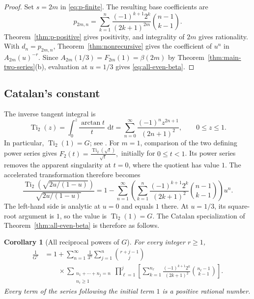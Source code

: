 \documentclass[11pt,reqno]{amsart}
\numberwithin{equation}{section}
\newtheorem{corollary}[theorem]{Corollary}
\theoremstyle{definition}
\theoremstyle{remark}
\DeclareMathOperator{\Ti}{Ti}
\newcommand{\dd}{\,\mathrm{d}}
\newcommand{\Gconst}{G}
\begin{document}
\begin{proof}
Set \(s=2m\) in \eqref{eq:p-finite}.  The resulting base coefficients
are
\[
 p_{2m,n}
 =
 \sum_{k=1}^{n}
 \frac{(-1)^{k+1}2^k}{(2k+1)^{2m}}
 \binom{n-1}{k-1}.
\]
Theorem~\ref{thm:p-positive} gives positivity, and integrality of
\(2m\) gives rationality.  With \(d_n=p_{2m,n}\),
Theorem~\ref{thm:nonrecursive} gives the coefficient of \(u^n\) in
\(A_{2m}(u)^{-r}\).  Since
\(
 A_{2m}(1/3)=F_{2m}(1)=\beta(2m)
\)
by Theorem~\ref{thm:main-two-series}(b), evaluation at \(u=1/3\)
gives \eqref{eq:all-even-beta}.
\end{proof}

\subsection{Catalan's constant}
\label{sec:catalan}

The inverse tangent integral is
\[
 \Ti_2(z)
 =
 \int_0^z\frac{\arctan t}{t}\,\dd t
 =
 \sum_{n=0}^{\infty}
 \frac{(-1)^nz^{2n+1}}{(2n+1)^2},
 \qquad 0\leq z\leq1.
\]
In particular, \(\Ti_2(1)=\Gconst\); see
\cite[Eqs, (1) and (3)]{Ramanujan1915}.  For \(m=1\), comparison of the two
defining power series gives
\(
 F_2(t)=\frac{\Ti_2(\sqrt t)}{\sqrt t},
\)
initially for \(0\leq t<1\).  Its power series removes the apparent
singularity at \(t=0\), where the quotient has value \(1\).  The
accelerated transformation therefore becomes
\begin{equation}\label{eq:transformed-Ti2}
 \frac{\Ti_2\!\left(\sqrt{2u/(1-u)}\right)}
 {\sqrt{2u/(1-u)}}
 =
 1-\sum_{n=1}^{\infty}
 \left(
 \sum_{k=1}^{n}
 \frac{(-1)^{k+1}2^k}{(2k+1)^2}
 \binom{n-1}{k-1}
 \right)u^n.
\end{equation}
The left-hand side is analytic at \(u=0\) and equals \(1\) there.  At
\(u=1/3\), its square-root argument is \(1\), so the value is
\(\Ti_2(1)=\Gconst\).  The Catalan specialization of
Theorem~\ref{thm:all-even-beta} is therefore as follows.

\begin{corollary}[All reciprocal powers of \(\Gconst\)]
\label{cor:all-G}
For every integer \(r\geq1\),
\begin{equation}\label{eq:all-G}
\begin{aligned}
 \frac1{\Gconst^r}
 &=1+
 \sum_{n=1}^{\infty}\frac1{3^n}
 \sum_{j=1}^{n}\binom{r+j-1}{j}\\
 &\qquad {}\times
 \sum_{\substack{n_1+\cdots+n_j=n\\n_i\geq1}}
 \prod_{\ell=1}^{j}
 \left[
 \sum_{k=1}^{n_\ell}
 \frac{(-1)^{k+1}2^k}{(2k+1)^2}
 \binom{n_\ell-1}{k-1}
 \right].
\end{aligned}
\end{equation}
Every term of the series following the initial term \(1\) is a
positive rational number.
\end{corollary}
\end{document}
